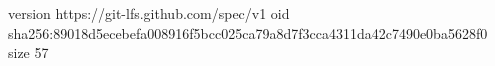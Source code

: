 version https://git-lfs.github.com/spec/v1
oid sha256:89018d5ecebefa008916f5bcc025ca79a8d7f3cca4311da42c7490e0ba5628f0
size 57
